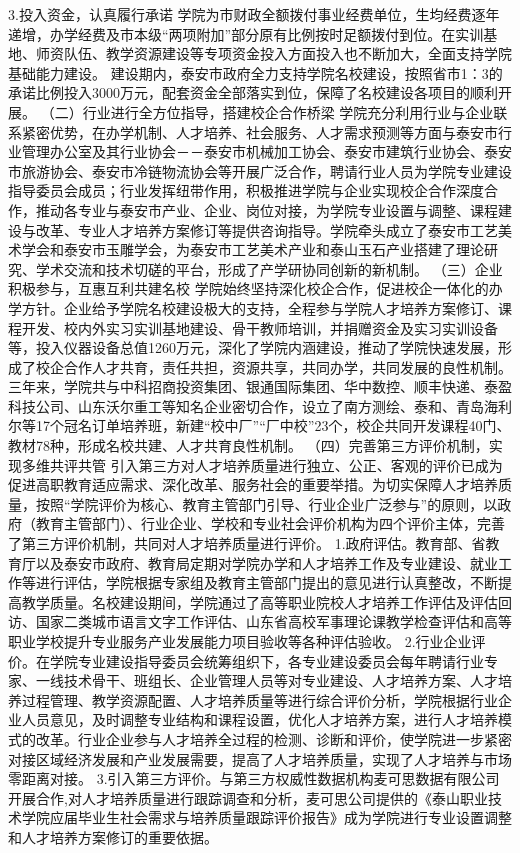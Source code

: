 3.投入资金，认真履行承诺
学院为市财政全额拨付事业经费单位，生均经费逐年递增，办学经费及市本级“两项附加”部分原有比例按时足额拨付到位。在实训基地、师资队伍、教学资源建设等专项资金投入方面投入也不断加大，全面支持学院基础能力建设。
建设期内，泰安市政府全力支持学院名校建设，按照省市1：3的承诺比例投入3000万元，配套资金全部落实到位，保障了名校建设各项目的顺利开展。
（二）行业进行全方位指导，搭建校企合作桥梁
学院充分利用行业与企业联系紧密优势，在办学机制、人才培养、社会服务、人才需求预测等方面与泰安市行业管理办公室及其行业协会－－泰安市机械加工协会、泰安市建筑行业协会、泰安市旅游协会、泰安市冷链物流协会等开展广泛合作，聘请行业人员为学院专业建设指导委员会成员；行业发挥纽带作用，积极推进学院与企业实现校企合作深度合作，推动各专业与泰安市产业、企业、岗位对接，为学院专业设置与调整、课程建设与改革、专业人才培养方案修订等提供咨询指导。学院牵头成立了泰安市工艺美术学会和泰安市玉雕学会，为泰安市工艺美术产业和泰山玉石产业搭建了理论研究、学术交流和技术切磋的平台，形成了产学研协同创新的新机制。
（三）企业积极参与，互惠互利共建名校
学院始终坚持深化校企合作，促进校企一体化的办学方针。企业给予学院名校建设极大的支持，全程参与学院人才培养方案修订、课程开发、校内外实习实训基地建设、骨干教师培训，并捐赠资金及实习实训设备等，投入仪器设备总值1260万元，深化了学院内涵建设，推动了学院快速发展，形成了校企合作人才共育，责任共担，资源共享，共同办学，共同发展的良性机制。三年来，学院共与中科招商投资集团、银通国际集团、华中数控、顺丰快递、泰盈科技公司、山东沃尔重工等知名企业密切合作，设立了南方测绘、泰和、青岛海利尔等17个冠名订单培养班，新建“校中厂”“厂中校”23个，校企共同开发课程40门、教材78种，形成名校共建、人才共育良性机制。
（四）完善第三方评价机制，实现多维共评共管
引入第三方对人才培养质量进行独立、公正、客观的评价已成为促进高职教育适应需求、深化改革、服务社会的重要举措。为切实保障人才培养质量，按照“学院评价为核心、教育主管部门引导、行业企业广泛参与”的原则，以政府（教育主管部门）、行业企业、学校和专业社会评价机构为四个评价主体，完善了第三方评价机制，共同对人才培养质量进行评价。
1.政府评估。教育部、省教育厅以及泰安市政府、教育局定期对学院办学和人才培养工作及专业建设、就业工作等进行评估，学院根据专家组及教育主管部门提出的意见进行认真整改，不断提高教学质量。名校建设期间，学院通过了高等职业院校人才培养工作评估及评估回访、国家二类城市语言文字工作评估、山东省高校军事理论课教学检查评估和高等职业学校提升专业服务产业发展能力项目验收等各种评估验收。
2.行业企业评价。在学院专业建设指导委员会统筹组织下，各专业建设委员会每年聘请行业专家、一线技术骨干、班组长、企业管理人员等对专业建设、人才培养方案、人才培养过程管理、教学资源配置、人才培养质量等进行综合评价分析，学院根据行业企业人员意见，及时调整专业结构和课程设置，优化人才培养方案，进行人才培养模式的改革。行业企业参与人才培养全过程的检测、诊断和评价，使学院进一步紧密对接区域经济发展和产业发展需要，提高了人才培养质量，实现了人才培养与市场零距离对接。
3.引入第三方评价。与第三方权威性数据机构麦可思数据有限公司开展合作,对人才培养质量进行跟踪调查和分析，麦可思公司提供的《泰山职业技术学院应届毕业生社会需求与培养质量跟踪评价报告》成为学院进行专业设置调整和人才培养方案修订的重要依据。
      
